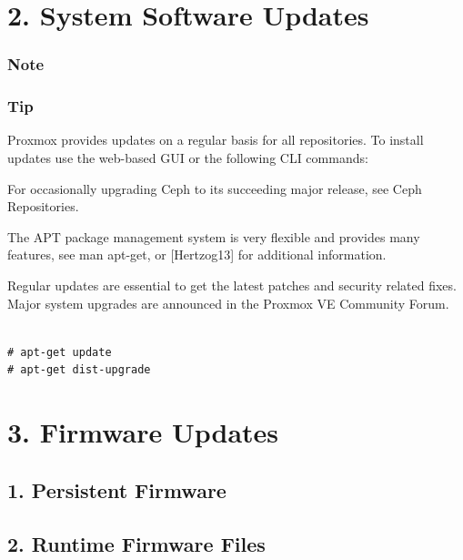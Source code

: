 \begin{table}[htbp]

\centering

\begin{tabular}

\end{tabular}

\end{table}


\section{2. System Software Updates}

\subsubsection{Note}

\subsubsection{Tip}

Proxmox provides updates on a regular basis for all repositories. To install updates use the web-based GUI or the following CLI commands:

For occasionally upgrading Ceph to its succeeding major release, see Ceph Repositories.

The APT package management system is very flexible and provides many features, see man apt-get, or [Hertzog13] for additional information.

Regular updates are essential to get the latest patches and security related fixes. Major system upgrades are announced in the Proxmox VE Community Forum.

\begin{lstlisting}

# apt-get update
# apt-get dist-upgrade

\end{lstlisting}


\section{3. Firmware Updates}

\subsection{1. Persistent Firmware}

\subsection{2. Runtime Firmware Files}

